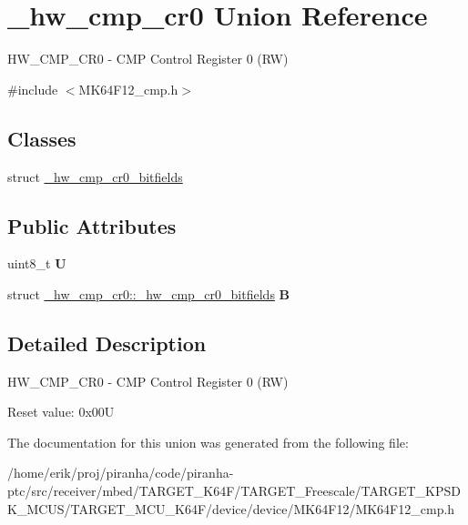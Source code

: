 \hypertarget{union__hw__cmp__cr0}{}\section{\+\_\+hw\+\_\+cmp\+\_\+cr0 Union Reference}
\label{union__hw__cmp__cr0}


H\+W\+\_\+\+C\+M\+P\+\_\+\+C\+R0 -\/ C\+MP Control Register 0 (RW)  




{\ttfamily \#include $<$M\+K64\+F12\+\_\+cmp.\+h$>$}

\subsection*{Classes}
\begin{DoxyCompactItemize}
\item 
struct \hyperlink{struct__hw__cmp__cr0_1_1__hw__cmp__cr0__bitfields}{\+\_\+hw\+\_\+cmp\+\_\+cr0\+\_\+bitfields}
\end{DoxyCompactItemize}
\subsection*{Public Attributes}
\begin{DoxyCompactItemize}
\item 
uint8\+\_\+t {\bfseries U}\hypertarget{union__hw__cmp__cr0_a5274190efc2d6fba98cb5f9eeb32a845}{}\label{union__hw__cmp__cr0_a5274190efc2d6fba98cb5f9eeb32a845}

\item 
struct \hyperlink{struct__hw__cmp__cr0_1_1__hw__cmp__cr0__bitfields}{\+\_\+hw\+\_\+cmp\+\_\+cr0\+::\+\_\+hw\+\_\+cmp\+\_\+cr0\+\_\+bitfields} {\bfseries B}\hypertarget{union__hw__cmp__cr0_a25735a99d64a0fda57b0fec26ee6a2cb}{}\label{union__hw__cmp__cr0_a25735a99d64a0fda57b0fec26ee6a2cb}

\end{DoxyCompactItemize}


\subsection{Detailed Description}
H\+W\+\_\+\+C\+M\+P\+\_\+\+C\+R0 -\/ C\+MP Control Register 0 (RW) 

Reset value\+: 0x00U 

The documentation for this union was generated from the following file\+:\begin{DoxyCompactItemize}
\item 
/home/erik/proj/piranha/code/piranha-\/ptc/src/receiver/mbed/\+T\+A\+R\+G\+E\+T\+\_\+\+K64\+F/\+T\+A\+R\+G\+E\+T\+\_\+\+Freescale/\+T\+A\+R\+G\+E\+T\+\_\+\+K\+P\+S\+D\+K\+\_\+\+M\+C\+U\+S/\+T\+A\+R\+G\+E\+T\+\_\+\+M\+C\+U\+\_\+\+K64\+F/device/device/\+M\+K64\+F12/M\+K64\+F12\+\_\+cmp.\+h\end{DoxyCompactItemize}
